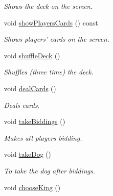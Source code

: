 \begin{DoxyCompactItemize}
\begin{DoxyCompactList}\small\item\em Shows the deck on the screen. \end{DoxyCompactList}\item 
\hypertarget{classGame_aed6d30748ef9db0a89fba543fa4b5dfb}{void \hyperlink{classGame_aed6d30748ef9db0a89fba543fa4b5dfb}{show\-Players\-Cards} () const }\label{classGame_aed6d30748ef9db0a89fba543fa4b5dfb}

\begin{DoxyCompactList}\small\item\em Shows players' cards on the screen. \end{DoxyCompactList}\item 
\hypertarget{classGame_a8eb0a092d23b426a8b4b03c4083b7afe}{void \hyperlink{classGame_a8eb0a092d23b426a8b4b03c4083b7afe}{shuffle\-Deck} ()}\label{classGame_a8eb0a092d23b426a8b4b03c4083b7afe}

\begin{DoxyCompactList}\small\item\em Shuffles (three time) the deck. \end{DoxyCompactList}\item 
\hypertarget{classGame_a234bc66c5663548d90368ecd142591b2}{void \hyperlink{classGame_a234bc66c5663548d90368ecd142591b2}{deal\-Cards} ()}\label{classGame_a234bc66c5663548d90368ecd142591b2}

\begin{DoxyCompactList}\small\item\em Deals cards. \end{DoxyCompactList}\item 
\hypertarget{classGame_ae8240e18a7b5ed1adec7663278afc256}{void \hyperlink{classGame_ae8240e18a7b5ed1adec7663278afc256}{take\-Biddings} ()}\label{classGame_ae8240e18a7b5ed1adec7663278afc256}

\begin{DoxyCompactList}\small\item\em Makes all players bidding. \end{DoxyCompactList}\item 
\hypertarget{classGame_ab725d07327db4dfb836e90eb08c83393}{void \hyperlink{classGame_ab725d07327db4dfb836e90eb08c83393}{take\-Dog} ()}\label{classGame_ab725d07327db4dfb836e90eb08c83393}

\begin{DoxyCompactList}\small\item\em To take the dog after biddings. \end{DoxyCompactList}\item 
\hypertarget{classGame_a68d2c56aaaa1b3d2c01bc9968f0166b2}{void \hyperlink{classGame_a68d2c56aaaa1b3d2c01bc9968f0166b2}{choose\-King} ()}\label{classGame_a68d2c56aaaa1b3d2c01bc9968f0166b2}


\end{DoxyCompactItemize}
